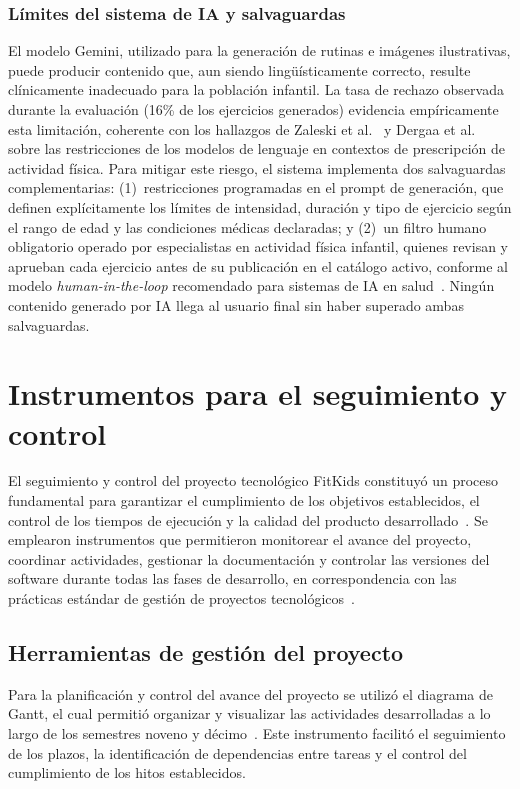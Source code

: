 				\subsubsection{Límites del sistema de IA y salvaguardas}
					El modelo Gemini, utilizado para la generación de rutinas e imágenes ilustrativas, puede producir contenido que, aun siendo lingüísticamente correcto, resulte clínicamente inadecuado para la población infantil. La tasa de rechazo observada durante la evaluación (16\% de los ejercicios generados) evidencia empíricamente esta limitación, coherente con los hallazgos de Zaleski et al.~\cite{Zaleski2026} y Dergaa et al.~\cite{Dergaa2024} sobre las restricciones de los modelos de lenguaje en contextos de prescripción de actividad física. Para mitigar este riesgo, el sistema implementa dos salvaguardas complementarias: (1)~restricciones programadas en el prompt de generación, que definen explícitamente los límites de intensidad, duración y tipo de ejercicio según el rango de edad y las condiciones médicas declaradas; y (2)~un filtro humano obligatorio operado por especialistas en actividad física infantil, quienes revisan y aprueban cada ejercicio antes de su publicación en el catálogo activo, conforme al modelo \textit{human-in-the-loop} recomendado para sistemas de IA en salud~\cite{Yim2024}. Ningún contenido generado por IA llega al usuario final sin haber superado ambas salvaguardas.
					
		\section{Instrumentos para el seguimiento y control}
			El seguimiento y control del proyecto tecnológico FitKids constituyó un proceso fundamental para garantizar el cumplimiento de los objetivos establecidos, el control de los tiempos de ejecución y la calidad del producto desarrollado~\cite{Fowler2002}. Se emplearon instrumentos que permitieron monitorear el avance del proyecto, coordinar actividades, gestionar la documentación y controlar las versiones del software durante todas las fases de desarrollo, en correspondencia con las prácticas estándar de gestión de proyectos tecnológicos~\cite{GuerreroUlloa2024}.
				
			\subsection{Herramientas de gestión del proyecto}
				Para la planificación y control del avance del proyecto se utilizó el diagrama de Gantt, el cual permitió organizar y visualizar las actividades desarrolladas a lo largo de los semestres noveno y décimo~\cite{Creswell2018}. Este instrumento facilitó el seguimiento de los plazos, la identificación de dependencias entre tareas y el control del cumplimiento de los hitos establecidos.
				
